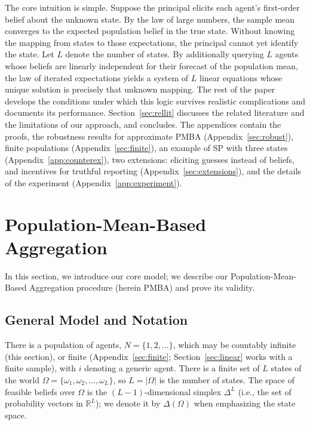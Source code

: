 \documentclass[12pt,reqno]{amsart}
\begin{document}
The core intuition is simple. Suppose the principal elicits each agent's first-order belief about the unknown state. By the law of large numbers, the sample mean converges to the expected population belief in the true state. Without knowing the mapping from states to those expectations, the principal cannot yet identify the state. Let $L$ denote the number of states. By additionally querying $L$ agents whose beliefs are linearly independent for their forecast of the population mean, the law of iterated expectations yields a system of $L$ linear equations whose unique solution is precisely that unknown mapping. The rest of the paper develops the conditions under which this logic survives realistic complications and documents its performance. Section~\ref{sec:rellit} discusses the related literature and the limitations of our approach, and concludes. The appendices contain the proofs, the robustness results for approximate PMBA (Appendix~\ref{sec:robust}), finite populations (Appendix~\ref{sec:finite}), an example of SP with three states (Appendix~\ref{app:counterex}), two extensions: eliciting guesses instead of beliefs, and incentives for truthful reporting (Appendix~\ref{sec:extensions}), and the details of the experiment (Appendix~\ref{app:experiment}).



\section{Population-Mean-Based Aggregation }\label{sec:pmba}
In this section, we introduce our core model; we describe our Population-Mean-Based Aggregation procedure (herein PMBA) and prove its validity. 

\subsection{General Model and Notation}
There is a population of agents, $N=\{1,2, \ldots \}$, which may be countably infinite (this section),  or finite (Appendix~\ref{sec:finite}; Section~\ref{sec:linear} works with a finite sample), with $i$ denoting a generic agent. There is a finite set of $L$ states of the world $\Omega = \{\omega_1, \omega_2, \ldots, \omega_L \}$, so $L=|\Omega|$ is the number of states. The space of feasible beliefs over $\Omega$ is the $(L-1)$-dimensional simplex $\Delta^L$ (i.e., the set of probability vectors in $\mathbb{R}^L$); we denote it by $\Delta(\Omega)$ when emphasizing the state space.
\end{document}
